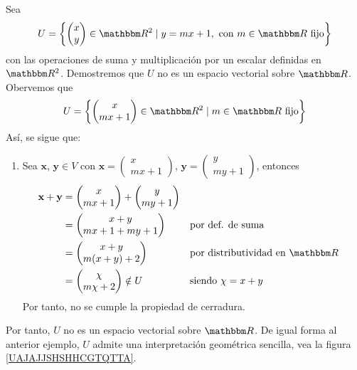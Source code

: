 \begin{examplebox}{}{}
    Sea
    $$\displaystyle U = \left\{ \begin{pmatrix}
        x \\
        y
    \end{pmatrix} \in \RR[2] \mid y = mx+1, \text{ con }  m \in \RR \text{ fijo} \right\}$$
    con las operaciones de suma y multiplicación por un escalar definidas en $\RR[2]$. Demostremos que $U$ no es un espacio vectorial sobre $\RR$. Obervemos que
    $$U = \left\{ \begin{pmatrix}
        x \\
        mx + 1
    \end{pmatrix} \in \RR[2] \mid m \in \RR \text{ fijo} \right\}$$
    Así, se sigue que:
    \begin{enumerate}[label=\roman*), topsep=6pt, itemsep=0pt]
        \item Sea $\mathbf{x}$, $\mathbf{y} \in V$ con $\mathbf{x} = \begin{pmatrix}
            x \\
            mx + 1
        \end{pmatrix}$, $\mathbf{y} = \begin{pmatrix}
            y \\
            my + 1
        \end{pmatrix}$, entonces
        \begin{align*}
            \mathbf{x} + \mathbf{y} & = \begin{pmatrix}
                x \\
                mx + 1
            \end{pmatrix} + \begin{pmatrix}
                y \\
                my + 1
            \end{pmatrix} \\
            & = \begin{pmatrix}
                x + y \\
                mx + 1 + my + 1
            \end{pmatrix} && \text{por def. de suma} \\
            & = \begin{pmatrix}
                x + y \\
                m(x + y) + 2
            \end{pmatrix} && \text{por distributividad en $\RR$} \\
            & = \begin{pmatrix}
                \chi \\
                m\chi + 2
            \end{pmatrix} \notin U && \text{siendo $\chi = x + y$}
        \end{align*}
        Por tanto, no se cumple la propiedad de cerradura.
    \end{enumerate}
    Por tanto, $U$ no es un espacio vectorial sobre $\RR$. De igual forma al anterior ejemplo, $U$ admite una interpretación geométrica sencilla, vea la figura \ref{UAJAJJSHSHHCGTQTTA}.
\end{examplebox}

